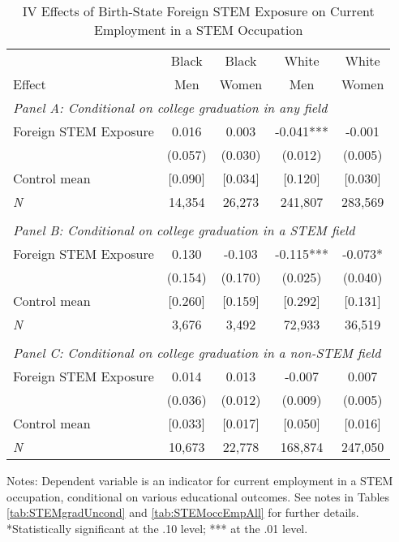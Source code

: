 \begin{table}[ht]
\caption{IV Effects of Birth-State Foreign STEM Exposure on Current Employment in a STEM Occupation}
\label{tab:ivSTEMoccEmpAll}
\centering
\begin{threeparttable}
\begin{tabular}{lcccc}
\toprule 
       & Black           & Black        & White        & White       \\
Effect & Men             & Women        & Men          & Women       \\
\midrule 
\multicolumn{5}{l}{\emph{Panel A: Conditional on college graduation in any field}}\\ 
Foreign STEM Exposure & 0.016  & 0.003  & -0.041*** & -0.001  \\ 
 &  (0.057) & (0.030) & (0.012) & (0.005) \\ 
Control mean &  [0.090] & [0.034] & [0.120] & [0.030] \\ 
\emph{N} &     14,354 &    26,273 &   241,807 &   283,569 \\ 
&&&&\\
\multicolumn{5}{l}{\emph{Panel B: Conditional on college graduation in a STEM field}}\\ 
Foreign STEM Exposure & 0.130  & -0.103  & -0.115*** & -0.073* \\ 
 &  (0.154) & (0.170) & (0.025) & (0.040) \\ 
Control mean &  [0.260] & [0.159] & [0.292] & [0.131] \\ 
\emph{N} &      3,676 &     3,492 &    72,933 &    36,519 \\ 
&&&&\\
\multicolumn{5}{l}{\emph{Panel C: Conditional on college graduation in a non-STEM field}}\\ 
Foreign STEM Exposure & 0.014  & 0.013  & -0.007  & 0.007  \\ 
 &  (0.036) & (0.012) & (0.009) & (0.005) \\ 
Control mean &  [0.033] & [0.017] & [0.050] & [0.016] \\ 
\emph{N} &     10,673 &    22,778 &   168,874 &   247,050 \\ 
\bottomrule 
\end{tabular} 
\footnotesize Notes: Dependent variable is an indicator for current employment in a STEM occupation, conditional on various educational outcomes.  See notes in Tables \ref{tab:STEMgradUncond} and \ref{tab:STEMoccEmpAll} for further details. *Statistically significant at the .10 level; *** at the .01 level.
\end{threeparttable} 
\end{table} 
